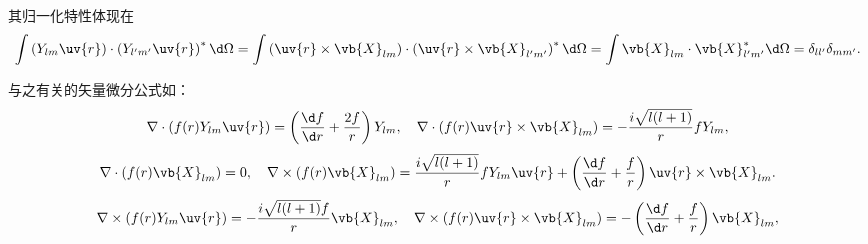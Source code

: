 其归一化特性体现在
\begin{equation*}
	\int \left(Y_{lm} \uv{r}\right) \cdot \left(Y_{l'm'} \uv{r}\right)^* \d \Omega =
	\int \left(\uv{r} \times \vb{X}_{lm}\right) \cdot \left(\uv{r} \times \vb{X}_{l'm'}\right)^* \d \Omega =
	\int \vb{X}_{lm} \cdot \vb{X}_{l'm'}^* \d \Omega = \delta_{ll'} \delta_{mm'}.
\end{equation*}

与之有关的矢量微分公式如：
\begin{equation*}
	\nabla \cdot \left(f(r) Y_{lm} \uv{r}\right) = \left(\frac{\d f}{\d r} + \frac{2f}{r}\right) Y_{lm},\quad
	\nabla \cdot \left(f(r) \uv{r} \times \vb{X}_{lm}\right) = -\frac{i\sqrt{l(l+1)}}{r} f Y_{lm},
\end{equation*}
\begin{equation*}
	\nabla \cdot \left(f(r) \vb{X}_{lm}\right) = 0,\quad \nabla \times \left(f(r) \vb{X}_{lm}\right) = \frac{i\sqrt{l(l+1)}}{r} f Y_{lm} \uv{r} + \left(\frac{\d f}{\d r} + \frac{f}{r}\right) \uv{r} \times \vb{X}_{lm}.
\end{equation*}
\begin{equation*}
	\nabla \times \left(f(r) Y_{lm} \uv{r}\right) = -\frac{i\sqrt{l(l+1)} f}{r} \vb{X}_{lm},\quad
	\nabla \times \left(f(r) \uv{r} \times \vb{X}_{lm}\right) = -\left(\frac{\d f}{\d r} + \frac{f}{r}\right) \vb{X}_{lm},
\end{equation*}

